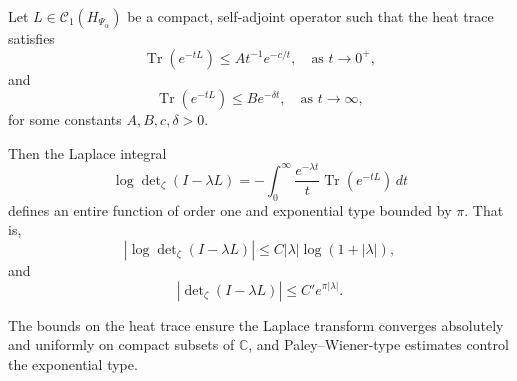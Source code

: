 \begin{lemma}
\label{lem:laplace-preserves-entire-type}
Let \( L \in \mathcal{C}_1(H_{\Psi_\alpha}) \) be a compact, self-adjoint operator such that the heat trace satisfies
\[
\operatorname{Tr}(e^{-tL}) \le A t^{-1} e^{-c/t}, \quad \text{as } t \to 0^+,
\]
and
\[
\operatorname{Tr}(e^{-tL}) \le B e^{-\delta t}, \quad \text{as } t \to \infty,
\]
for some constants \( A,B,c,\delta > 0 \).

Then the Laplace integral
\[
\log \det\nolimits_\zeta(I - \lambda L)
= - \int_0^\infty \frac{e^{-\lambda t}}{t} \operatorname{Tr}(e^{-tL})\, dt
\]
defines an entire function of order one and exponential type bounded by \( \pi \). That is,
\[
\left| \log \det\nolimits_\zeta(I - \lambda L) \right| \le C |\lambda| \log(1 + |\lambda|),
\]
and
\[
\left| \det\nolimits_\zeta(I - \lambda L) \right| \le C' e^{\pi |\lambda|}.
\]
\end{lemma}

\medskip
\noindent
The bounds on the heat trace ensure the Laplace transform converges absolutely and uniformly on compact subsets of \( \mathbb{C} \), and Paley–Wiener-type estimates control the exponential type.
%  